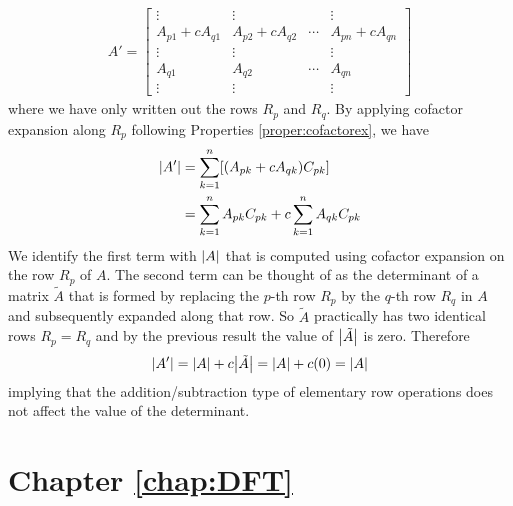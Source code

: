 \begin{align*}
A' = 
\begin{bmatrix}
\vdots & \vdots & & \vdots\\
A_{p1} + cA_{q1} & A_{p2} + cA_{q2} & \cdots & A_{pn} + cA_{qn} \\
\vdots & \vdots & & \vdots\\
A_{q1} & A_{q2} & \cdots & A_{qn} \\
\vdots & \vdots & & \vdots
\end{bmatrix}
\end{align*}
where we have only written out the rows $R_p$ and $R_q$. By applying cofactor expansion along $R_p$ following Properties \ref{proper:cofactorex}, we have
\begin{align}
\abs{A'} &= \sum_{k=1}^{n} [(A_{pk} + cA_{qk}) C_{pk}] \nonumber \\
&= \sum_{k=1}^{n} A_{pk}C_{pk} + c\sum_{k=1}^{n} A_{qk}C_{pk}
\end{align}
We identify the first term with $\abs{A}$ that is computed using cofactor expansion on the row $R_p$ of $A$. The second term can be thought of as the determinant of a matrix $\tilde{A}$ that is formed by replacing the $p$-th row $R_p$ by the $q$-th row $R_q$ in $A$ and subsequently expanded along that row. So $\tilde{A}$ practically has two identical rows $R_p = R_q$ and by the previous result the value of $\abs{\tilde{A}}$ is zero. Therefore
\begin{align}
\abs{A'} = \abs{A} + c\abs{\tilde{A}} = \abs{A} + c(0) = \abs{A}    
\end{align} implying that the addition/subtraction type of elementary row operations does not affect the value of the determinant.

\section{Chapter \ref*{chap:DFT}}
\label{section:DFTappend}

